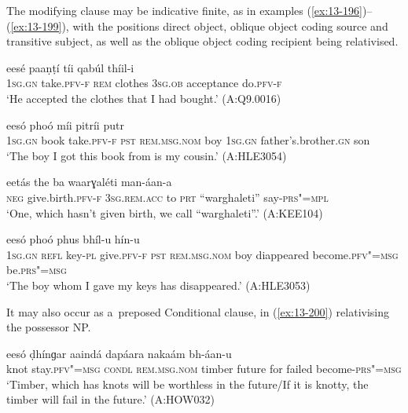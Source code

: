 The modifying clause may be indicative finite, as in examples (\ref{ex:13-196})--(\ref{ex:13-199}), with the positions direct object, oblique object coding source and transitive subject, as well as the oblique object coding recipient being relativised.

\begin{exe}
\ex
\label{ex:13-196}
 eesé paaṇṭí tíi qabúl  thíil-i \\
\textsc{1sg.gn} take.\textsc{pfv-f} \textsc{rem} clothes \textsc{3sg.ob} acceptance do.\textsc{pfv-f} \\
\glt `He accepted the clothes that I had bought.' (A:Q9.0016)

\ex
\label{ex:13-197}
 eesó phoó  míi pitríi putr \\
\textsc{1sg.gn} book take.\textsc{pfv-f} \textsc{pst} \textsc{rem.msg.nom} boy  \textsc{1sg.gn} father's.brother.\textsc{gn} son \\
\glt `The boy I got this book from is my cousin.' (A:HLE3054)

\ex
\label{ex:13-198}
\gll [na ǰéel-i] eetás the ba  waarɣaléti man-áan-a \\
\textsc{neg} give.birth.\textsc{pfv-f} \textsc{3sg.rem.acc} to \textsc{prt}  ``warghaleti'' say-\textsc{prs"=mpl} \\
\glt `One, which hasn't given birth, we call ``warghaleti''.' (A:KEE104)

\ex
\label{ex:13-199}
 eesó  phoó phus bhíl-u hín-u  \\
\textsc{1sg.gn} \textsc{refl} key-\textsc{pl} give.\textsc{pfv-f} \textsc{pst} \textsc{rem.msg.nom}  boy diappeared become.\textsc{pfv"=msg} be.\textsc{prs"=msg} \\
\glt `The boy whom I gave my keys has disappeared.' (A:HLE3053) 
\end{exe}

It may also occur as a~preposed Conditional clause, in (\ref{ex:13-200}) relativising the possessor NP.

\begin{exe}
\ex
\label{ex:13-200}
 eesó ḍhínɡar aaindá  dapáara nakaám bh-áan-u  \\
knot stay.\textsc{pfv"=msg} \textsc{condl} \textsc{rem.msg.nom} timber future  for failed become-\textsc{prs"=msg} \\
\glt `Timber, which has knots will be worthless in the future/If it is knotty, the timber will fail in the future.' (A:HOW032) 
\end{exe}

